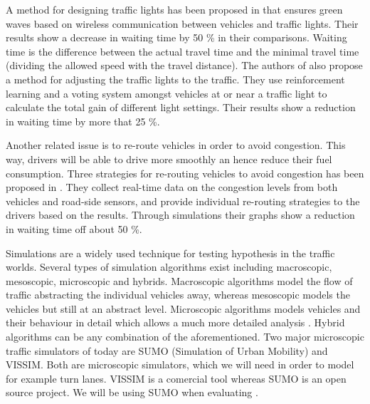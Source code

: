 A method for designing traffic lights has been proposed in \cite{SOTL} that ensures green waves based on wireless communication between vehicles and traffic lights. 
Their results show a decrease in waiting time by 50 \% in their comparisons. 
Waiting time is the difference between the actual travel time and the minimal travel time (dividing the allowed speed with the travel distance).
The authors of \cite{ITLC} also propose a method for adjusting the traffic lights to the traffic. 
They use reinforcement learning and a voting system amongst vehicles at or near a traffic light to calculate the total gain of different light settings. 
Their results show a reduction in waiting time by more that 25 \%.

Another related issue is to re-route vehicles in order to avoid congestion. 
This way, drivers will be able to drive more smoothly an hence reduce their fuel consumption. 
Three strategies for re-routing vehicles to avoid congestion has been proposed in \cite{congestionAvoidance}. 
They collect real-time data on the congestion levels from both vehicles and road-side sensors, and provide individual re-routing strategies to the drivers based on the results. 
Through simulations their graphs show a reduction in waiting time off about 50 \%.

Simulations are a widely used technique for testing hypothesis in the traffic worlds.
Several types of simulation algorithms exist including macroscopic, mesoscopic, microscopic and hybrids.
Macroscopic algorithms model the flow of traffic abstracting the individual vehicles away, whereas mesoscopic models the vehicles but still at an abstract level. 
Microscopic algorithms models vehicles and their behaviour in detail which allows a much more detailed analysis \cite{meso-micro}. 
Hybrid algorithms can be any combination of the aforementioned.
Two major microscopic traffic simulators of today are SUMO (Simulation of Urban Mobility)\cite{sumo} and VISSIM\cite{vissim}.
Both are microscopic simulators, which we will need in order to model for example turn lanes.
VISSIM is a comercial tool whereas SUMO is an open source project.
We will be using SUMO when evaluating \tech.






